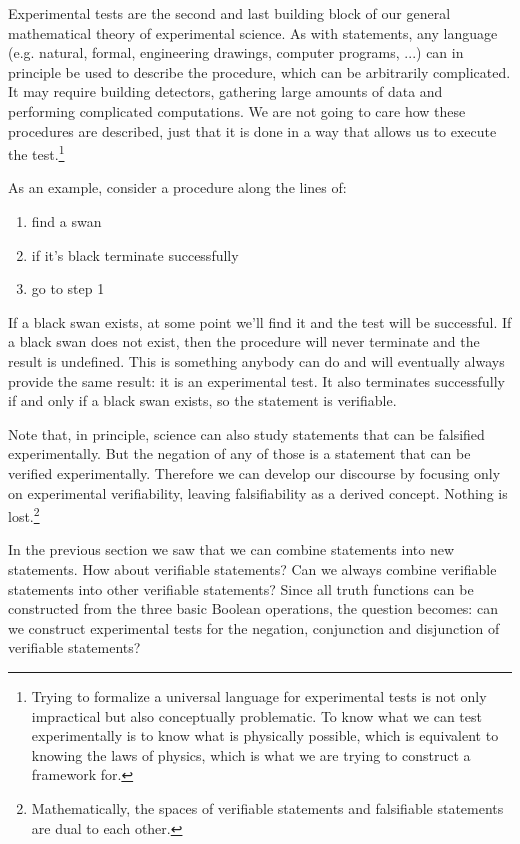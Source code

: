 	Experimental tests are the second and last building block of our general mathematical theory of experimental science. As with statements, any language (e.g. natural, formal, engineering drawings, computer programs, ...) can in principle be used to describe the procedure, which can be arbitrarily complicated. It may require building detectors, gathering large amounts of data and performing complicated computations. We are not going to care how these procedures are described, just that it is done in a way that allows us to execute the test.\footnote{Trying to formalize a universal language for experimental tests is not only impractical but also conceptually problematic. To know what we can test experimentally is to know what is physically possible, which is equivalent to knowing the laws of physics, which is what we are trying to construct a framework for.}
	
	As an example, consider a procedure along the lines of:
	\begin{enumerate}
		\item find a swan
		\item if it's black terminate successfully
		\item go to step 1
	\end{enumerate}
	If a black swan exists, at some point we'll find it and the test will be successful. If a black swan does not exist, then the procedure will never terminate and the result is undefined. This is something anybody can do and will eventually always provide the same result: it is an experimental test. It also terminates successfully if and only if a black swan exists, so the statement  is verifiable.
	
	Note that, in principle, science can also study statements that can be falsified experimentally. But the negation of any of those is a statement that can be verified experimentally. Therefore we can develop our discourse by focusing only on experimental verifiability, leaving falsifiability as a derived concept. Nothing is lost.\footnote{Mathematically, the spaces of verifiable statements and falsifiable statements are dual to each other.}
	
	In the previous section we saw that we can combine statements into new statements. How about verifiable statements? Can we always combine verifiable statements into other verifiable statements? Since all truth functions can be constructed from the three basic Boolean operations, the question becomes: can we construct experimental tests for the negation, conjunction and disjunction of verifiable statements?
	
